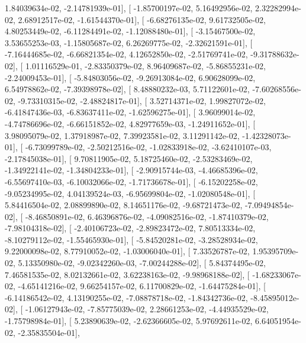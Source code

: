 \documentclass{article}
\begin{document}
          1.84039634e-02,  -2.14781939e-01],
       [ -1.85700197e-02,   5.16492956e-02,   2.32282994e-02,
          2.68912517e-02,  -1.61544370e-01],
       [ -6.68276135e-02,   9.61732505e-02,   4.80253449e-02,
         -6.11284491e-02,  -1.12088480e-01],
       [ -3.15467500e-02,   3.53655253e-03,  -1.15805687e-02,
          6.26269775e-02,  -2.32621591e-01],
       [ -7.16444685e-02,  -6.66821354e-02,   4.12652850e-02,
         -2.51769741e-02,  -9.31788632e-02],
       [  1.01116529e-01,  -2.83350379e-02,   8.96409687e-02,
         -5.86855231e-02,  -2.24009453e-01],
       [ -5.84803056e-02,  -9.26913084e-02,   6.90628099e-02,
          6.54978862e-02,  -7.39398978e-02],
       [  8.48880232e-03,   5.71122601e-02,  -7.60268556e-02,
         -9.73310315e-02,  -2.48824817e-01],
       [  3.52714371e-02,   1.99827072e-02,  -6.41847436e-03,
         -6.83637411e-02,  -1.62596275e-01],
       [  3.96099014e-02,  -4.74786696e-02,  -6.66151852e-02,
          4.82977659e-03,  -1.24911652e-01],
       [  3.98095079e-02,   1.37918987e-02,   7.39923581e-02,
          3.11291142e-02,  -1.42328073e-01],
       [ -6.73099789e-02,  -2.50212516e-02,  -1.02833918e-02,
         -3.62410107e-03,  -2.17845038e-01],
       [  9.70811905e-02,   5.18725460e-02,  -2.53283469e-02,
         -1.34922141e-02,  -1.34804233e-01],
       [ -2.90915744e-03,  -4.46685396e-02,  -6.55697410e-03,
         -6.10032066e-02,  -1.71736678e-01],
       [ -6.15202258e-02,  -9.05234995e-02,   4.04139524e-03,
         -6.95699804e-02,  -1.02080548e-01],
       [  5.84416504e-02,   2.08899890e-02,   8.14651176e-02,
         -9.68721473e-02,  -7.09494854e-02],
       [ -8.46850891e-02,   6.46396876e-02,  -4.09082516e-02,
         -1.87410379e-02,  -7.98104318e-02],
       [ -2.40106723e-02,  -2.89823472e-02,   7.80513334e-02,
         -8.10279112e-02,  -1.55465930e-01],
       [ -5.84520281e-02,  -3.28528934e-02,   9.22000098e-02,
          8.77910052e-02,  -1.03006040e-01],
       [  7.33526787e-02,   1.95395709e-02,   5.13350980e-02,
         -9.02342260e-03,  -7.00244288e-02],
       [  5.84374495e-02,   7.46581535e-02,   8.02132661e-02,
          3.62238163e-02,  -9.98968188e-02],
       [ -1.68233067e-02,  -4.65141216e-02,   9.66254157e-02,
          6.11700829e-02,  -1.64475284e-01],
       [ -6.14186542e-02,   4.13190255e-02,  -7.08878718e-02,
         -1.84342736e-02,  -8.45895012e-02],
       [ -1.06127943e-02,  -7.85775039e-02,   2.28661253e-02,
         -4.44935529e-02,  -1.75798984e-01],
       [  5.23890639e-02,  -2.62366605e-02,   5.97692611e-02,
          6.64051954e-02,  -2.35835504e-01],
\end{document}
